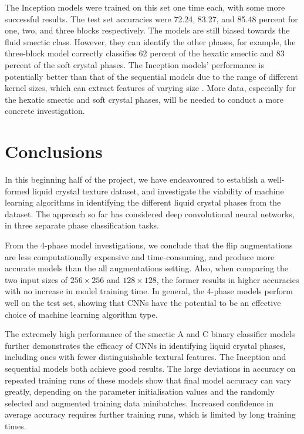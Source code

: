 \documentclass[12pt]{article}
\begin{document}
The Inception models were trained on this set one time each, with some more successful results. The test set accuracies were 72.24, 83.27, and 85.48 percent for one, two, and three blocks respectively. The models are still biased towards the fluid smectic class. However, they can identify the other phases, for example, the three-block model correctly classifies 62 percent of the hexatic smectic and 83 percent of the soft crystal phases. The Inception models' performance is potentially better than that of the sequential models due to the range of different kernel sizes, which can extract features of varying size \cite{Aghdam17}. More data, especially for the hexatic smectic and soft crystal phases, will be needed to conduct a more concrete investigation.
\section{Conclusions}
In this beginning half of the project, we have endeavoured to establish a well-formed liquid crystal texture dataset, and investigate the viability of machine learning algorithms in identifying the different liquid crystal phases from the dataset. The approach so far has considered deep convolutional neural networks, in three separate phase classification tasks. 

From the 4-phase model investigations, we conclude that the flip augmentations are less computationally expensive and time-consuming, and produce more accurate models than the all augmentations setting. Also, when comparing the two input sizes of $256 \times 256$ and $128 \times 128$, the former results in higher accuracies with no increase in model training time. In general, the 4-phase models perform well on the test set, showing that CNNs have the potential to be an effective choice of machine learning algorithm type.

The extremely high performance of the smectic A and C binary classifier models further demonstrates the efficacy of CNNs in identifying liquid crystal phases, including ones with fewer distinguishable textural features. The Inception and sequential models both achieve good results. The large deviations in accuracy on repeated training runs of these models show that final model accuracy can vary greatly, depending on the parameter initialisation values and the randomly selected and augmented training data minibatches. Increased confidence in average accuracy requires further training runs, which is limited by long training times. 
\end{document}
